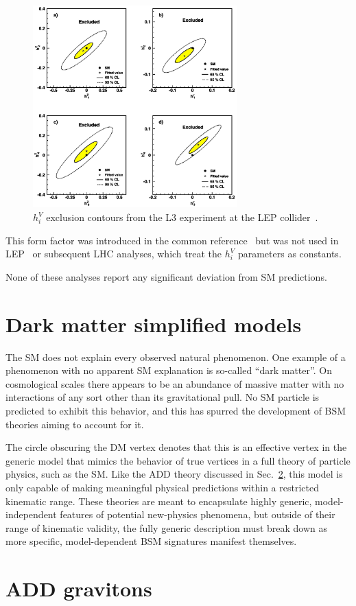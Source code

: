 \documentclass[oneside, letterpaper, 12pt, oldfontcommands]{memoir}
\begin{document}
\begin{figure}[hbtp]
  \begin{center}
    \includegraphics[width=0.7\textwidth]{Figures/L3_atgc_contours.jpg}
    \caption{
      $h_{i}^{V}$ exclusion contours from the L3 experiment at the LEP collider~\cite{ref:j.physletb.2004.07.002}.
    }
    \label{fig:L3_atgc_contours}
  \end{center}
\end{figure}

This form factor was introduced in the common reference~\cite{ref:PhysRevD.47.4889} but was not used in LEP~\cite{ref:j.physrep.2013.07.004}
or subsequent LHC analyses, which treat the $h_{i}^{V}$ parameters as constants.

None of these analyses report any significant deviation from SM predictions.

\section{Dark matter simplified models} \label{sec:introduction_dark_matter}
The SM does not explain every observed natural phenomenon. One example of a phenomenon with no apparent SM explanation is so-called ``dark matter''.
On cosmological scales there appears to be an abundance of massive
matter with no interactions of any sort other than its gravitational pull. No SM particle is predicted to exhibit this behavior, and
this has spurred the development of BSM theories aiming to account for it.

The circle obscuring the DM vertex
denotes that this is an effective vertex in the generic model that mimics the behavior of true vertices in a full theory of particle physics,
such as the SM. Like the ADD theory discussed in Sec.~\ref{sec:introduction_ADD}, this model is only capable of making meaningful physical
predictions within a restricted kinematic range. These theories are meant to encapsulate highly generic, model-independent features of potential
new-physics phenomena, but outside of their range of kinematic validity, the fully generic description must break down as more specific,
model-dependent BSM signatures manifest themselves.

\section{ADD gravitons} \label{sec:introduction_ADD}



\end{document}
